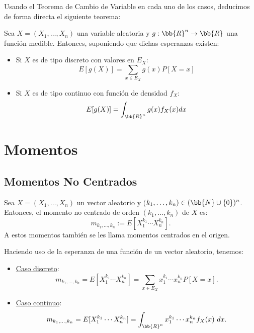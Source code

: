 Usando el Teorema de Cambio de Variable en cada uno de los casos, deducimos de forma directa el siguiente teorema:
\begin{teo}
    Sea $X=(X_1,\dots,X_n)$ una variable aleatoria y $g:\bb{R}^n\to \bb{R}$ una función medible. Entonces, suponiendo que dichas esperanzas existen:
    \begin{itemize}
        \item Si $X$ es de tipo discreto con valores en $E_X$:
        \begin{equation*}
            E[g(X)] = \sum_{x\in E_X}g(x)P[X=x]
        \end{equation*}

        \item Si $X$ es de tipo continuo con función de densidad $f_X$:
        \begin{equation*}
            E[g(X)] = \int_{\bb{R}^n} g(x)f_X(x) dx
        \end{equation*}
    \end{itemize}
\end{teo}

\section{Momentos}

\subsection{Momentos No Centrados}

\begin{definicion}
    Sea $X=(X_1,\dots,X_n)$ un vector aleatorio y ($k_1,\dots,k_n)\in (\bb{N}\cup \{0\})^n$. Entonces, el momento no centrado de orden $(k_1,\dots,k_n)$ de $X$ es:
    \begin{equation*}
        m_{k_1,\dots,k_n} := E[X_1^{k_1}\cdots X_n^{k_n}].
    \end{equation*}
    A estos momentos también se les llama momentos centrados en el origen.
\end{definicion}

Haciendo uso de la esperanza de una función de un vector aleatorio, tenemos:
\begin{itemize}
    \item \ul{Caso discreto}:
    \begin{equation*}
        m_{k_1,\dots,k_n}=E[X_1^{k_1}\cdots X_n^{k_n}] = \sum_{x\in E_X} x_1^{k_1}\cdots x_n^{k_n} P[X=x].
    \end{equation*}

    \item \ul{Caso continuo}:
    \begin{equation*}
        m_{k_1,\dots,k_n}=E[X_1^{k_1}\cdots X_n^{k_n}] = \int_{\bb{R}^n} x_1^{k_1}\cdots x_n^{k_n} f_X(x)~d x.
    \end{equation*}
\end{itemize}

